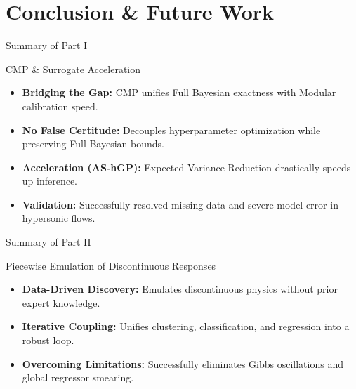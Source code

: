 \section[Conclusion]{Conclusion \& Future Work}

\begin{frame}{Summary of Part I}
    \begin{block}{CMP \& Surrogate Acceleration}
        \begin{itemize}
            \item \textbf{Bridging the Gap:} CMP unifies Full Bayesian exactness with Modular calibration speed.
            \item \textbf{No False Certitude:} Decouples hyperparameter optimization while preserving Full Bayesian bounds.
            \item \textbf{Acceleration (AS-hGP):} Expected Variance Reduction drastically speeds up inference.
            \item \textbf{Validation:} Successfully resolved missing data and severe model error in hypersonic flows.
        \end{itemize}
    \end{block}
\end{frame}

\begin{frame}{Summary of Part II}
    \begin{block}{Piecewise Emulation of Discontinuous Responses}
        \begin{itemize}
            \item \textbf{Data-Driven Discovery:} Emulates discontinuous physics without prior expert knowledge.
            \item \textbf{Iterative Coupling:} Unifies clustering, classification, and regression into a robust loop.
            \item \textbf{Overcoming Limitations:} Successfully eliminates Gibbs oscillations and global regressor smearing.
        \end{itemize}
    \end{block}
\end{frame}

